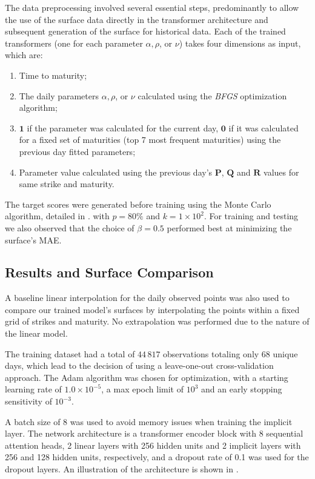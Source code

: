 The data preprocessing involved several essential steps, predominantly to allow the use of the surface data directly
in the transformer architecture and subsequent generation of the surface for historical data.
Each of the trained transformers (one for each parameter $\alpha, \rho$, or $\nu$) takes four dimensions as input, which are:
\begin{enumerate}
    \item Time to maturity;
    \item The daily parameters $\alpha, \rho$, or $\nu$ calculated using the \textit{BFGS} optimization algorithm;
    \item $\mathbf{1}$ if the parameter was calculated for the current day, $\mathbf{0}$ if it was calculated for a fixed set of maturities
    (top 7 most frequent maturities) using the previous day fitted parameters;
    \item Parameter value calculated using the previous day's $\mathbf{P}$, $\mathbf{Q}$ and $\mathbf{R}$ values for same strike and maturity.
\end{enumerate}

The target scores were generated before training using the Monte Carlo algorithm, detailed in .
with $p = 80\%$ and $k = 1 \times 10^{2}$.
For training and testing we also observed that the choice of $\beta = 0.5$ performed best at minimizing the surface's MAE.

\subsection{Results and Surface Comparison}
\label{subsec:results}

A baseline linear interpolation for the daily observed points was also used to compare our trained
model's surfaces by interpolating the points within a fixed grid of strikes and maturity.
No extrapolation was performed due to the nature of the linear model.

The training dataset had a total of $44\,817$ observations totaling only 68 unique days, which lead to the decision of using a leave-one-out cross-validation approach.
The Adam algorithm was chosen for optimization, with a starting learning rate of $1.0\times10^{-5}$,
a max epoch limit of $10^{3}$ and an early stopping sensitivity of $10^{-3}$.

A batch size of 8 was used to avoid memory issues when training the implicit layer.
The network architecture is a transformer encoder block with 8 sequential attention heads,
2 linear layers with 256 hidden units and 2 implicit layers with 256 and 128 hidden units, respectively, and a dropout rate of 0.1 was used for the dropout layers.
An illustration of the architecture is shown in .

